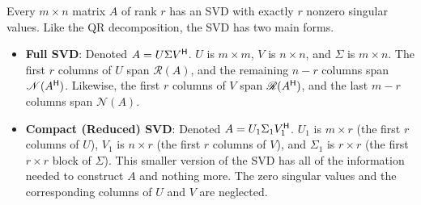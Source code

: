 Every $m\times n$ matrix $A$ of rank $r$ has an SVD with exactly $r$ nonzero singular values.
Like the QR decomposition, the SVD has two main forms.
\begin{itemize}
    \item \textbf{Full SVD}: Denoted $A = U\Sigma V^{\mathsf H}$.
    $U$ is $m\times m$, $V$ is $n\times n$, and $\Sigma$ is $m\times n$.
    The first $r$ columns of $U$ span $\mathscr{R}(A)$, and the remaining $n -r$ columns span $\mathscr{N}(A^{\mathsf H})$.
    Likewise, the first $r$ columns of $V$ span $\mathscr{R}(A^{\mathsf H})$, and the last $m - r$ columns span $\mathscr{N}(A)$.
    \item \textbf{Compact (Reduced) SVD}: Denoted $A = U_1\Sigma_1 V^{\mathsf H}_1$.
    $U_1$ is $m\times r$ (the first $r$ columns of $U$), $V_1$ is $n \times r$ (the first $r$ columns of $V$), and $\Sigma_1$ is $r\times r$ (the first $r\times r$ block of $\Sigma$).
    This smaller version of the SVD has all of the information needed to construct $A$ and nothing more.
    The zero singular values and the corresponding columns of $U$ and $V$ are neglected.
\end{itemize}
%
